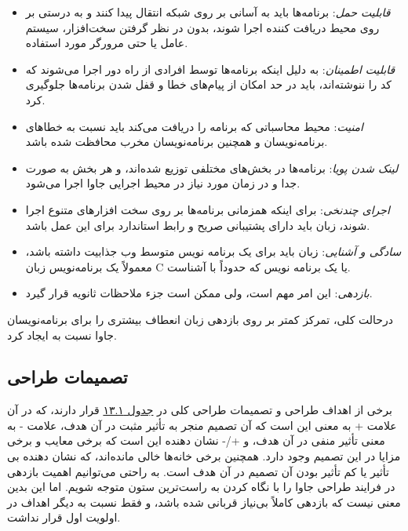 \documentclass[a4paper,12pt]{report}
\begin{document}
	\begin{itemize}[nosep]
		\renewcommand{\labelitemi}{\color{gray}\scriptsize$\blacksquare$}
		\item 
		\textit{
		قابلیت حمل}: برنامه‌ها باید به آسانی بر روی شبکه انتقال پیدا کنند و به درستی بر روی محیط دریافت کننده اجرا شوند، بدون در نظر گرفتن سخت‌افزار، سیستم عامل یا حتی مرورگر مورد استفاده.
		\item
		\textit{
		قابلیت اطمینان}: به دلیل اینکه برنامه‌ها توسط افرادی از راه دور اجرا می‌شوند که کد را ننوشته‌اند، باید در حد امکان از پیام‌های خطا و قفل شدن برنامه‌ها جلوگیری کرد.
		\item \textit{
		امنیت}: محیط محاسباتی که برنامه را دریافت می‌کند باید نسبت به خطا‌های برنامه‌نویسان و همچنین برنامه‌نویسان مخرب محافظت شده باشد.
		\item \textit{
		لینک شدن پویا}: برنامه‌ها در بخش‌های مختلفی توزیع شده‌اند، و هر بخش به صورت جدا و در زمان مورد نیاز در محیط اجرایی جاوا اجرا می‌شود.
		\item \textit{
		اجرای چندنخی}: برای اینکه همزمانی برنامه‌ها بر روی سخت افزار‌های متنوع اجرا شوند، زبان باید دارای پشتیبانی صریح و رابط استاندارد برای این عمل  باشد.
		\item \textit{
		سادگی و آشنایی}: زبان باید برای یک برنامه نویس متوسط وب جذابیت داشته باشد، معمولاً یک برنامه‌نویس زبان C یا یک برنامه نویس که حدوداً با 
		آشناست.
		\item \textit{
		بازدهی}: این امر مهم است، ولی ممکن است جزء ملاحظات ثانویه قرار گیرد.
	\end{itemize}
	
	درحالت کلی، تمرکز کمتر بر روی بازدهی زبان انعطاف بیشتری را برای برنامه‌نویسان جاوا نسبت به 
	ایجاد کرد.	
	
	\subsection{تصمیمات طراحی}\label{subsec2:sec1:chap13}
	برخی از اهداف طراحی و تصمیمات طراحی کلی در 
	\hyperref[table1:chap13]{جدول ۱۳.۱}
	 قرار دارند، که در آن علامت + به معنی این است که آن تصمیم منجر به تأثیر مثبت در آن هدف، علامت - به معنی تأثیر منفی در آن هدف، و +/-	نشان دهنده این است که برخی معایب و برخی مزایا در این تصمیم وجود دارد. همچنین برخی خانه‌ها خالی مانده‌اند، که نشان دهنده بی تأثیر یا کم تأثیر بودن آن تصمیم در آن هدف است. به راحتی می‌توانیم اهمیت بازدهی در فرایند طراحی جاوا را با نگاه کردن به  راست‌ترین ستون متوجه شویم. اما این بدین معنی نیست که بازدهی کاملاً بی‌نیاز قربانی شده باشد، و فقط نسبت به دیگر اهداف در اولویت اول قرار نداشت.
	
\end{document}
